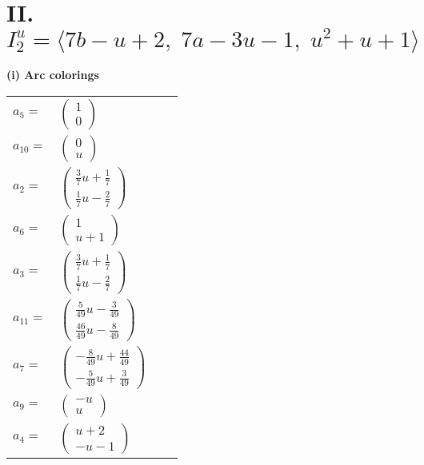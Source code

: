 \documentclass[1p]{elsarticle_modified}
\theoremstyle{definition}
\begin{document}
\centering \section*{II. $I^u_{2}= \langle 7 b- u+2,\;7 a-3 u-1,\;u^2+u+1 \rangle$}
\flushleft \textbf{(i) Arc colorings}\\
\begin{tabular}{m{7pt} m{180pt} m{7pt} m{180pt} }
\flushright $a_{5}=$&$\begin{pmatrix}1\\0\end{pmatrix}$ \\
\flushright $a_{10}=$&$\begin{pmatrix}0\\u\end{pmatrix}$ \\
\flushright $a_{2}=$&$\begin{pmatrix}\frac{3}{7} u+\frac{1}{7}\\\frac{1}{7} u-\frac{2}{7}\end{pmatrix}$ \\
\flushright $a_{6}=$&$\begin{pmatrix}1\\u+1\end{pmatrix}$ \\
\flushright $a_{3}=$&$\begin{pmatrix}\frac{3}{7} u+\frac{1}{7}\\\frac{1}{7} u-\frac{2}{7}\end{pmatrix}$ \\
\flushright $a_{11}=$&$\begin{pmatrix}\frac{5}{49} u-\frac{3}{49}\\\frac{46}{49} u-\frac{8}{49}\end{pmatrix}$ \\
\flushright $a_{7}=$&$\begin{pmatrix}-\frac{8}{49} u+\frac{44}{49}\\-\frac{5}{49} u+\frac{3}{49}\end{pmatrix}$ \\
\flushright $a_{9}=$&$\begin{pmatrix}- u\\u\end{pmatrix}$ \\
\flushright $a_{4}=$&$\begin{pmatrix}u+2\\- u-1\end{pmatrix}$ \\

\end{tabular}
\end{document}
